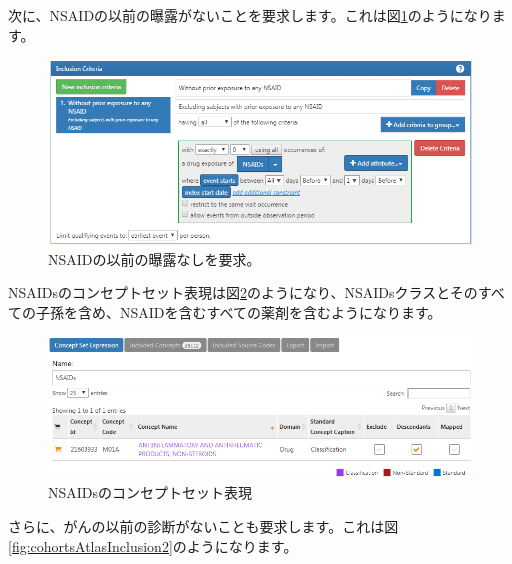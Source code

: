 \documentclass[
  11pt]{book}
\theoremstyle{definition}
\theoremstyle{definition}
\theoremstyle{definition}
\theoremstyle{definition}
\theoremstyle{remark}
\begin{document}
次に、NSAIDの以前の曝露がないことを要求します。これは図\ref{fig:cohortsAtlasInclusion1}のようになります。

\begin{figure}

{\centering \includegraphics[width=1\linewidth]{images/SuggestedAnswers/cohortsAtlasInclusion1} 

}

\caption{NSAIDの以前の曝露なしを要求。}\label{fig:cohortsAtlasInclusion1}
\end{figure}

NSAIDsのコンセプトセット表現は図\ref{fig:cohortsAtlasConceptSet2}のようになり、NSAIDsクラスとそのすべての子孫を含め、NSAIDを含むすべての薬剤を含むようになります。

\begin{figure}

{\centering \includegraphics[width=1\linewidth]{images/SuggestedAnswers/cohortsAtlasConceptSet2} 

}

\caption{NSAIDsのコンセプトセット表現}\label{fig:cohortsAtlasConceptSet2}
\end{figure}

さらに、がんの以前の診断がないことも要求します。これは図\ref{fig:cohortsAtlasInclusion2}のようになります。
\end{document}
